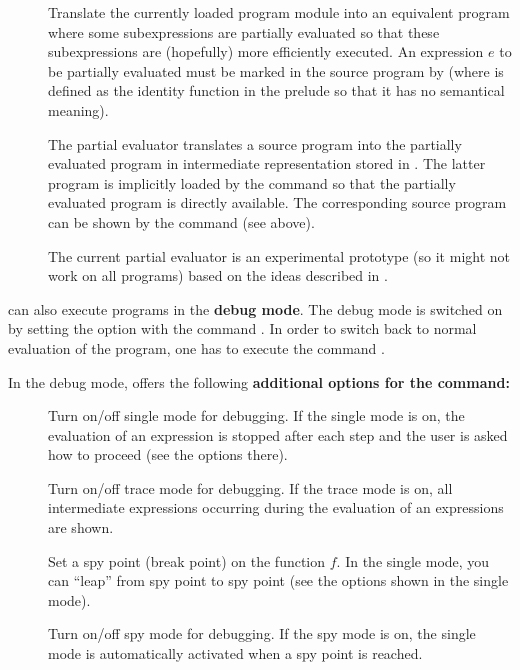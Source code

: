 \begin{description}
\item[]
Translate the currently loaded program module into an equivalent
program where some subexpressions are partially evaluated
so that these subexpressions are (hopefully) more efficiently executed.
An expression $e$ to be partially evaluated
must be marked in the source program by 
(where  is defined as the identity function in the prelude
so that it has no semantical meaning).

The partial evaluator
translates a source program  into the
partially evaluated program in intermediate representation
stored in . The latter program is implicitly loaded
by the  command so that the partially evaluated program
is directly available. The corresponding source program
can be shown by the  command (see above).

The current partial evaluator is an experimental prototype
(so it might not work on all programs) based on the ideas
described in \cite{AlbertAlpuenteHanusVidal99LPAR,AlbertHanusVidal00LPAR,%
AlbertHanusVidal01FLOPS,AlbertHanusVidal02JFLP}.

\end{description}
%
\bigskip
%
\CYS can also execute programs in the {\bf debug mode}.
The debug mode is switched on by setting the  option
with the command . In order to switch
back to normal evaluation of the program, one has to execute
the command .

In the debug mode, \CYS offers the following
{\bf additional options for the  command:}
%
\begin{description}
\item[]
Turn on/off single mode for debugging.
If the single mode is on, the evaluation of an expression
is stopped after each step and the user is asked how to proceed
(see the options there).

\item[]
Turn on/off trace mode for debugging.
If the trace mode is on, all intermediate expressions occurring
during the evaluation of an expressions are shown.

\item[]
Set a spy point (break point) on the
function $f$. In the single mode, you can ``leap'' from spy point
to spy point (see the options shown in the single mode).

\item[] Turn on/off spy mode for debugging.
If the spy mode is on, the single mode is automatically activated
when a spy point is reached.
\end{description}


